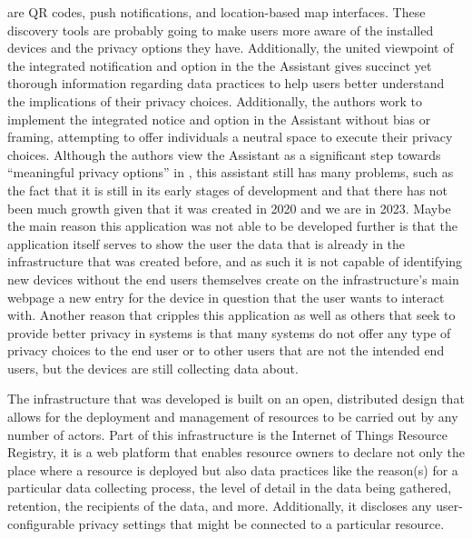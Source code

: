 are QR codes, push notifications, and location-based map interfaces. These
discovery tools are probably going to make users more aware of the installed
\hyperlink{\acronym}{\acronym} devices and the privacy options they have. Additionally, the united
viewpoint of the integrated notification and option in the the \hyperlink{\acronym}{\acronym} Assistant
gives succinct yet thorough information regarding \hyperlink{\acronym}{\acronym} data practices to
help users better understand the implications of their privacy choices.
Additionally, the authors work to implement the integrated notice and option
in the \hyperlink{\acronym}{\acronym} Assistant without bias or framing, attempting to offer individuals
a neutral space to execute their privacy choices. Although the authors view
the \hyperlink{\acronym}{\acronym} Assistant as a significant step towards ``meaningful privacy options''
in \hyperlink{\acronym}{\acronym}, this assistant still has many problems, such as the fact that it
is still in its early stages of development and that there has not been much
growth given that it was created in 2020 and we are in 2023. Maybe the main
reason this application was not able to be developed further is that the
application itself serves to show the user the data that is already in the
\hyperlink{\acronym}{\acronym} infrastructure that was created before, and as such it is not capable
of identifying new \hyperlink{\acronym}{\acronym} devices without the end users themselves create on
the infrastructure's main webpage \cite{DasPersonalized} a new entry for
the device in question that the user wants to interact with. Another reason
that cripples this application as well as others that seek to provide better
privacy in \hyperlink{\acronym}{\acronym} systems is that many systems do not offer any type of privacy
choices to the end user or to other users that are not the intended end
users, but the devices are still collecting data about.

The \hyperlink{\acronym}{\acronym} infrastructure that was developed \cite{DasPersonalized} is built
on an open, distributed design that allows for the deployment and management
of \hyperlink{\acronym}{\acronym} resources to be carried out by any number of actors. Part of this
infrastructure is the Internet of Things Resource Registry, it is a web
platform that enables resource owners to declare not only the place where
a resource is deployed but also data practices like the reason(s) for a
particular data collecting process, the level of detail in the data being
gathered, retention, the recipients of the data, and more. Additionally,
it discloses any user-configurable privacy settings that might be connected
to a particular resource.

